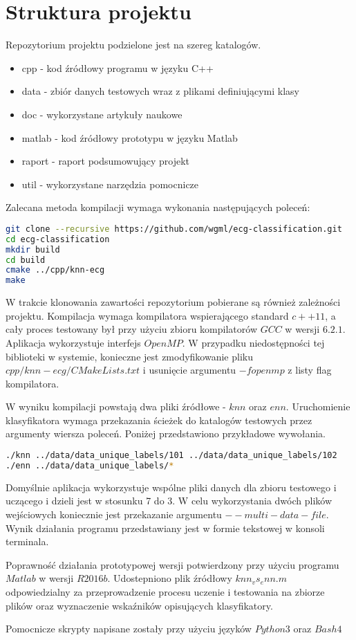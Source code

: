 \section{Struktura projektu}
Repozytorium projektu podzielone jest na szereg katalogów.
\begin{itemize}  
	\item cpp - kod źródłowy programu w języku C++ 
	\item data - zbiór danych testowych wraz z plikami definiującymi klasy
	\item doc - wykorzystane artykuły naukowe
	\item matlab - kod źródłowy prototypu w języku Matlab
	\item raport - raport podsumowujący projekt
	\item util - wykorzystane narzędzia pomocnicze
\end{itemize}


Zalecana metoda kompilacji wymaga wykonania następujących poleceń:
\begin{lstlisting}[language=bash,caption=Kompilacja programu]
git clone --recursive https://github.com/wgml/ecg-classification.git
cd ecg-classification
mkdir build
cd build
cmake ../cpp/knn-ecg
make
\end{lstlisting}

W trakcie klonowania zawartości repozytorium pobierane są również zależności projektu. Kompilacja wymaga kompilatora wspierającego standard $c++11$, a cały proces testowany był przy użyciu zbioru kompilatorów $GCC$ w wersji $6.2.1$. Aplikacja wykorzystuje interfejs $OpenMP$. W przypadku niedostępności tej biblioteki w systemie, konieczne jest zmodyfikowanie pliku $cpp/knn-ecg/CMakeLists.txt$ i usunięcie argumentu $-fopenmp$ z listy flag kompilatora.

W wyniku kompilacji powstają dwa pliki źródłowe - $knn$ oraz $enn$.
Uruchomienie klasyfikatora wymaga przekazania ścieżek do katalogów testowych przez argumenty wiersza poleceń. Poniżej przedstawiono przykładowe wywołania.

\begin{lstlisting}[language=bash,caption=Uruchamianie aplikacji]
./knn ../data/data_unique_labels/101 ../data/data_unique_labels/102
./enn ../data/data_unique_labels/*
\end{lstlisting}

Domyślnie aplikacja wykorzystuje wspólne pliki danych dla zbioru testowego i uczącego i dzieli jest w stosunku 7 do 3. W celu wykorzystania dwóch plików wejściowych koniecznie jest przekazanie argumentu $--multi-data-file$.
Wynik działania programu przedstawiany jest w formie tekstowej w konsoli terminala.

Poprawność działania prototypowej wersji potwierdzony przy użyciu programu $Matlab$ w wersji $R2016b$. Udostepniono plik źródłowy $knn_vs_enn.m$ odpowiedzialny za przeprowadzenie procesu uczenie i testowania na zbiorze plików oraz wyznaczenie wskaźników opisujących klasyfikatory.

Pomocnicze skrypty napisane zostały przy użyciu języków $Python 3$ oraz $Bash 4$